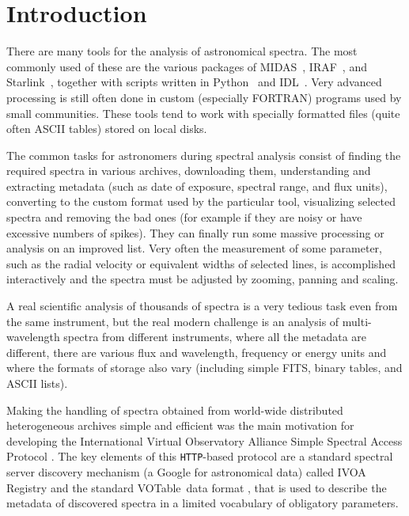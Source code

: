 \documentclass[final,authoryear,5p,times,twocolumn]{elsarticle}
\newcommand{\ssap}{\texttt{SSAP}}
\newcommand{\votable}{VOTable}
\newcommand{\IRAF}{\textsf{\small IRAF}}
\newcommand{\IDL}{\textsf{\small IDL}}
\newcommand{\python}{\textsf{\small Python}}
\newcommand{\Starlink}{\textsf{\small Starlink}}
\newcommand{\ascl}[1]{\href{http://www.ascl.net/#1}{ascl:#1}}
\begin{document}
\section{Introduction}
%
There are many tools for the analysis of astronomical spectra.  The most
commonly used of these are the various packages of MIDAS\
\citep[][\ascl{1302.017}]{1992ASPC...25..115W}, \IRAF\
\citep[][\ascl{9911.002}]{2012ASPC..461..595F}, and \Starlink\
\citep[][\ascl{1110.012}]{1982QJRAS..23..485D}, together with scripts written
in \python\ \citep[e.g.,][]{2013A&A...558A..33A} and \IDL\
\citep[e.g.,][]{1993ASPC...52..246L}.  Very advanced processing is still often
done in custom (especially FORTRAN) programs used by small communities.  These
tools tend to work with specially formatted files (quite often ASCII tables)
stored on local disks.

The common tasks for astronomers during spectral analysis consist of finding
the required spectra in various archives, downloading them, understanding and
extracting metadata (such as date of exposure, spectral range, and flux units),
converting to the custom format used by the particular tool, visualizing
selected spectra and  removing the bad ones (for example if they are noisy or
have excessive numbers of spikes). They can finally run some massive processing
or analysis on an improved list.  Very often the measurement of some parameter,
such as the radial velocity or equivalent widths of selected lines, is
accomplished interactively and the spectra must be adjusted by zooming, panning
and scaling.

A real scientific analysis of thousands of spectra is a very tedious task even
from the same instrument, but the real modern challenge is an analysis of
multi-wavelength spectra from different instruments, where all the metadata are
different, there are various flux and wavelength, frequency or energy units
and where the formats of storage also vary (including simple FITS, binary
tables, and ASCII lists).

Making the handling of spectra obtained from world-wide distributed
heterogeneous archives simple and efficient was the main motivation for
developing the International Virtual Observatory Alliance Simple Spectral
Access Protocol \citep[IVOA \ssap;][]{ssap}. The key elements of this
\texttt{HTTP}-based protocol are a standard spectral server discovery mechanism
(a Google for astronomical data) called IVOA Registry \citep{registry} and  the
standard \votable\ data format \citep{2004tivo.conf..118O}, that is used to
describe the metadata of discovered spectra in a limited vocabulary of
obligatory parameters.
\end{document}

